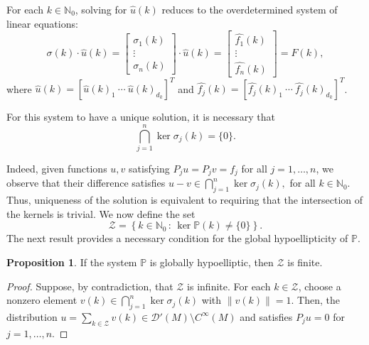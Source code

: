 \documentclass{amsart}
\theoremstyle{definition}
\newtheorem{proposition}[theorem]{Proposition}
\theoremstyle{remark}
\numberwithin{equation}{section}
\begin{document}
	
	For each $k\in\mathbb{N}_0$, solving for $\widehat{u}(k)$ reduces to the overdetermined system of linear equations:
	\begin{equation}\label{system}
		\sigma(k) \cdot \widehat{u}(k) =
		\begin{bmatrix}
			\sigma_1(k)\\ \vdots \\ \sigma_n(k)
		\end{bmatrix} \cdot \widehat{u}(k)
		=
		\begin{bmatrix} 
			\widehat{f_1}(k)\\ \vdots \\ \widehat{f_n}(k)
		\end{bmatrix} = F(k),
	\end{equation}
	where  $\widehat{u}(k) = [\widehat{u}(k)_1 \ \cdots \ \widehat{u}(k)_{d_k}]^T$ and $\widehat{f_j}(k) =
		[ \widehat{f_j}(k)_1 \ \cdots \ \widehat{f_j}(k)_{d_k}]^T$.
		
	
	For this system to have a unique solution, it is necessary that  
	\begin{equation*}
		\bigcap_{j=1}^{n}\ker\sigma_j(k)=\{0\}.
	\end{equation*}
	
	Indeed, given functions $u,v$ satisfying $P_ju = P_jv = f_j$ for all $j=1,\dots,n$, we observe that their difference satisfies  $	u-v\in\bigcap_{j=1}^n\ker\sigma_j(k),$ for all $k\in\mathbb{N}_0.$ 
	Thus, uniqueness of the solution is equivalent to requiring that the intersection of the kernels is trivial. We now define the set
	\begin{equation*}
		\mathcal{Z}=\left\{k\in\mathbb{N}_0\,:\, \ker\mathbb{P}(k)\neq \{0\}\right\}.
	\end{equation*}
	The next result provides a necessary condition for the global hypoellipticity of $\mathbb{P}$.
	
	\begin{proposition}\label{prop_Z}
		If the system $\mathbb{P}$ is globally hypoelliptic, then $\mathcal{Z}$ is finite.
	\end{proposition}	
	\begin{proof}
		Suppose, by contradiction, that $\mathcal{Z}$ is infinite. For each $k\in\mathcal{Z}$, choose a nonzero element $v(k)\in\bigcap_{j=1}^n\ker\sigma_j(k)$ with $\|v(k)\|=1$. Then, the distribution  
		$u=\sum_{k\in\mathcal{Z}}v(k) \in \mathscr{D}'(M)\setminus C^\infty(M)$ and satisfies $P_j u = 0$ for $j=1,\dots,n$.
	\end{proof}
\end{document}
